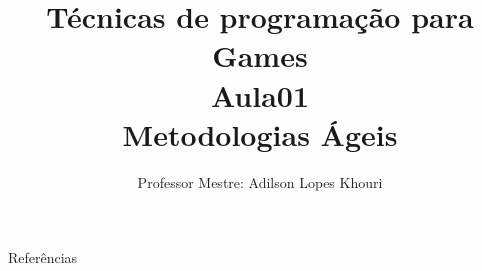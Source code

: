 \documentclass[compress, hyperref={pdfpagelayout=SinglePage}]{beamer}
\title[AED - Aula 01]{Técnicas de programação para Games \\ Aula01 \\ Metodologias Ágeis}
\author{Professor Mestre: Adilson Lopes Khouri}
\begin{document}
	\begin{frame}
		\titlepage
	\end{frame}

	
	
	
	
	
	
	
		
	
		
	
		
	
		
		
	

	


	\begin{frame}{}
		\begin{block}{Referências}
			\tiny
			\nocite{*}
			
	    		
		\end{block}
	\end{frame}
\end{document}
